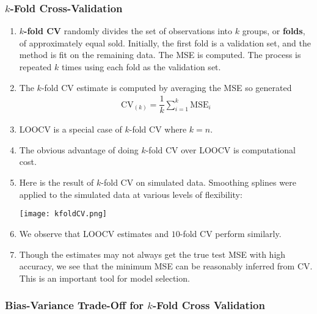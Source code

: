 \documentclass[10pt]{article}
\begin{document}
\subsubsection{$k$-Fold Cross-Validation} 
\begin{enumerate}
	\item \textbf{$k$-fold CV} randomly divides the set of observations into $k$ groups, or \textbf{folds}, of approximately equal sold.  Initially, the first fold is a validation set, and the method is fit on the remaining data.  The MSE is computed.  The process is repeated $k$ times using each fold as the validation set.
	\item The $k$-fold CV estimate is computed by averaging the MSE so generated 
	\begin{align*}
		\textrm{CV}_{(k)} = \dfrac{1}{k} \sum_{i = 1}^k \textrm{MSE}_i
	\end{align*}
	\item LOOCV is a special case of $k$-fold CV where $k = n$.
	\item The obvious advantage of doing $k$-fold CV over LOOCV is computational cost. 
	\item Here is the result of $k$-fold CV on simulated data.  Smoothing splines were applied to the simulated data at various levels of flexibility:
	
	\texttt{[image: kfoldCV.png]}
	\item We observe that LOOCV estimates and $10$-fold CV perform similarly.  
	\item Though the estimates may not always get the true test MSE with high accuracy, we see that the minimum MSE can be reasonably inferred from CV.  This is an important tool for model selection.
\end{enumerate}

\subsubsection{Bias-Variance Trade-Off for $k$-Fold Cross Validation} 
\end{document}
